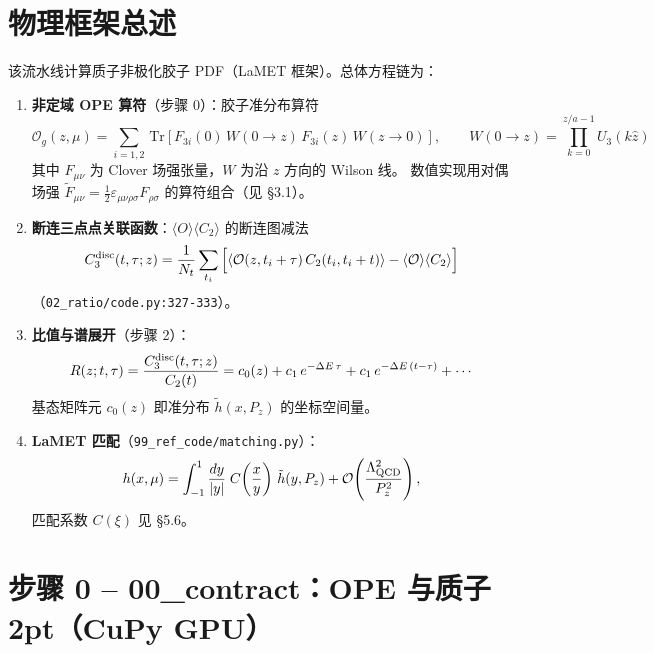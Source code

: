 \documentclass[UTF8]{ctexart}
\begin{document}
\section{物理框架总述}

该流水线计算质子非极化胶子 PDF（LaMET 框架）。总体方程链为：

\begin{enumerate}[itemsep=2pt]
  \item \textbf{非定域 OPE 算符}（步骤 0）：胶子准分布算符
  \begin{equation}
    \mathcal{O}_{g}(z,\mu) = \sum_{i=1,2} \,\mathrm{Tr}\left[
      F_{3i}(0)\,W(0\to z)\,F_{3i}(z)\,W(z\to 0) \right],
    \qquad W(0\!\to\! z)=\prod_{k=0}^{z/a-1} U_3(k\hat{z})
  \end{equation}
  其中 $F_{\mu\nu}$ 为 Clover 场强张量，$W$ 为沿 $z$ 方向的 Wilson 线。
  数值实现用对偶场强 $\tilde F_{\mu\nu}=\tfrac12\varepsilon_{\mu\nu\rho\sigma}F_{\rho\sigma}$
  的算符组合（见 \S3.1）。
  \item \textbf{断连三点点关联函数}：$\langle O\rangle\langle C_2\rangle$ 的断连图减法
  \begin{equation}
    C_3^{\rm disc}(t,\tau;z) = \frac{1}{N_t}\sum_{t_i}\Big[
      \langle \mathcal{O}(z,t_i+\tau)\,C_2(t_i,t_i+t)\rangle
      - \langle \mathcal{O}\rangle\langle C_2\rangle\Big]
  \end{equation}
  （\texttt{02\_ratio/code.py:327-333}）。
  \item \textbf{比值与谱展开}（步骤 2）：
  \begin{equation}
    R(z;t,\tau)=\frac{C_3^{\rm disc}(t,\tau;z)}{C_2(t)}
    = c_0(z) + c_1\,e^{-\Delta E\,\tau} + c_1\,e^{-\Delta E\,(t-\tau)} + \cdots
  \end{equation}
  基态矩阵元 $c_0(z)$ 即准分布 $\tilde h(x,P_z)$ 的坐标空间量。
  \item \textbf{LaMET 匹配}（\texttt{99\_ref\_code/matching.py}）：
  \begin{equation}
    h(x,\mu) = \int_{-1}^{1}\frac{dy}{|y|}\; C\!\left(\frac{x}{y}\right)\,
    \tilde h(y,P_z) + \mathcal{O}\!\left(\frac{\Lambda_{\rm QCD}^2}{P_z^2}\right),
  \end{equation}
  匹配系数 $C(\xi)$ 见 \S5.6。
\end{enumerate}

\section{步骤 0 -- 00\_contract：OPE 与质子 2pt（CuPy GPU）}
\end{document}
